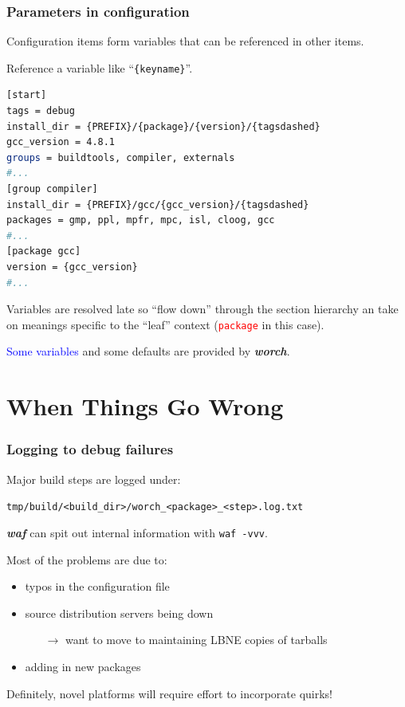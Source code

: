 \documentclass[xcolor=dvipsnames]{beamer}
\newcommand{\app}[1]{\textbf{\textit{#1}}\xspace}
\def\waf{\app{waf}}
\def\worch{\app{worch}}
\begin{document}
\begin{frame}[fragile]
  \frametitle{Parameters in configuration}

  Configuration items form variables that can be referenced in other items.

  Reference a variable like ``\texttt{\{keyname\}}''.

  \begin{lstlisting}[language=bash,emph={package,version,gcc_version},emph={[2]PREFIX,tagsdashed},emphstyle={[2]\color{blue}}]
[start]
tags = debug
install_dir = {PREFIX}/{package}/{version}/{tagsdashed}
gcc_version = 4.8.1
groups = buildtools, compiler, externals
#...
[group compiler]
install_dir = {PREFIX}/gcc/{gcc_version}/{tagsdashed}
packages = gmp, ppl, mpfr, mpc, isl, cloog, gcc
#...
[package gcc]
version = {gcc_version}
#...
  \end{lstlisting}
  Variables are resolved late so ``flow down'' through the section hierarchy an take on meanings specific to the ``leaf'' context (\textcolor{red}{\texttt{package}} in this case).

  \textcolor{blue}{Some variables} and some defaults are provided by \worch.
\end{frame}

\section{When Things Go Wrong}

\begin{frame}[fragile]
  \frametitle{Logging to debug failures}
  Major build steps are logged under:

  \verb|tmp/build/<build_dir>/worch_<package>_<step>.log.txt|

  \waf can spit out internal information with \texttt{waf -vvv}.

  Most of the problems are due to:

  \begin{itemize}
  \item typos in the configuration file
  \item source distribution servers being down
    \begin{itemize}
    \item[$\rightarrow$] want to move to maintaining LBNE copies of tarballs
    \end{itemize}
  \item adding in new packages
  \end{itemize}

  Definitely, novel platforms will require effort to incorporate quirks!

\end{frame}
\end{document}

